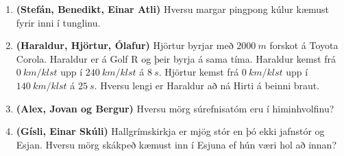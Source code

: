 \begin{enumerate}[label = \textbf{Dæmi \thechapter.\arabic*.}]
\item \textbf{(Stefán, Benedikt, Einar Atli)} Hversu margar pingpong kúlur kæmust fyrir inni í tunglinu.

\item \textbf{(Haraldur, Hjörtur, Ólafur)} Hjörtur byrjar með $\SI{2000}{m}$ forskot á Toyota Corola. Haraldur er á Golf R og þeir byrja á sama tíma. Haraldur kemst frá $\SI{0}{km/klst}$ upp í $\SI{240}{km/klst}$ á $\SI{8}{s}$. Hjörtur kemst frá $\SI{0}{km/klst}$ upp í $\SI{140}{km/klst}$ á $\SI{25}{s}$. Hversu lengi er Haraldur að ná Hirti á beinni braut.

\item \textbf{(Alex, Jovan og Bergur)} Hversu mörg súrefnisatóm eru í himinhvolfinu?

\item \textbf{(Gísli, Einar Skúli)} Hallgrímskirkja er mjög stór en þó ekki jafnstór og Esjan. Hversu mörg skákpeð kæmust inn í Esjuna ef hún væri hol að innan?

\end{enumerate}

\newpage